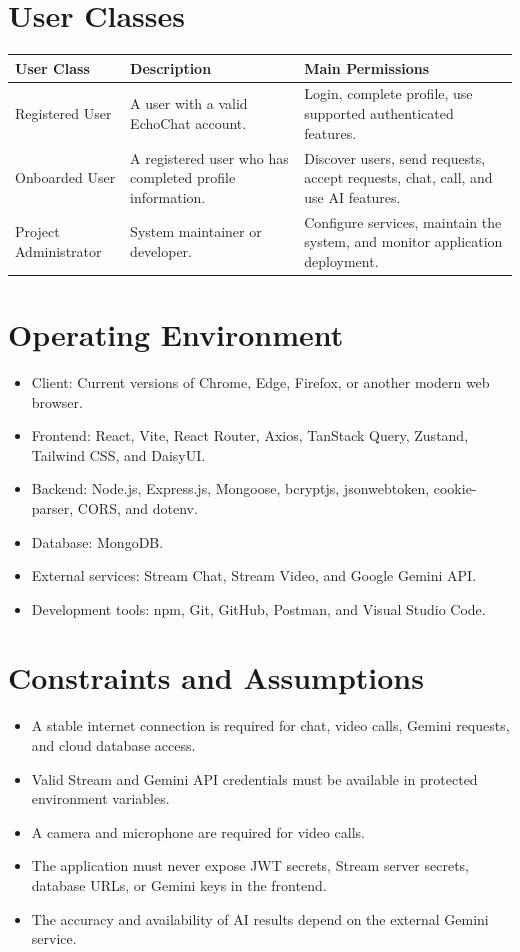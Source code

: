 \documentclass[12pt,a4paper]{report}
\begin{document}
\section{User Classes}
\begin{longtable}{|p{1.5in}|p{2.0in}|p{2.8in}|}
\hline
\rowcolor{gray!25}\textbf{User Class} & \textbf{Description} & \textbf{Main Permissions} \\ \hline
Registered User & A user with a valid EchoChat account. & Login, complete profile, use supported authenticated features. \\ \hline
Onboarded User & A registered user who has completed profile information. & Discover users, send requests, accept requests, chat, call, and use AI features. \\ \hline
Project Administrator & System maintainer or developer. & Configure services, maintain the system, and monitor application deployment. \\ \hline
\end{longtable}

\section{Operating Environment}
\begin{itemize}[leftmargin=0.45in]
\item Client: Current versions of Chrome, Edge, Firefox, or another modern web browser.
\item Frontend: React, Vite, React Router, Axios, TanStack Query, Zustand, Tailwind CSS, and DaisyUI.
\item Backend: Node.js, Express.js, Mongoose, bcryptjs, jsonwebtoken, cookie-parser, CORS, and dotenv.
\item Database: MongoDB.
\item External services: Stream Chat, Stream Video, and Google Gemini API.
\item Development tools: npm, Git, GitHub, Postman, and Visual Studio Code.
\end{itemize}

\section{Constraints and Assumptions}
\begin{itemize}[leftmargin=0.45in]
\item A stable internet connection is required for chat, video calls, Gemini requests, and cloud database access.
\item Valid Stream and Gemini API credentials must be available in protected environment variables.
\item A camera and microphone are required for video calls.
\item The application must never expose JWT secrets, Stream server secrets, database URLs, or Gemini keys in the frontend.
\item The accuracy and availability of AI results depend on the external Gemini service.
\end{itemize}
\end{document}
